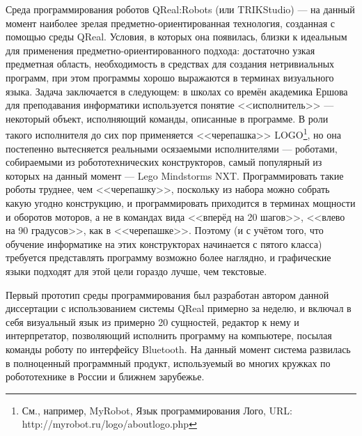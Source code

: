 Среда программирования роботов QReal:Robots (или TRIKStudio) --- на данный момент наиболее зрелая 
предметно-ориентированная технология, созданная с помощью среды QReal. 
Условия, в которых она появилась, близки к идеальным для применения 
предметно-ориентированного подхода: достаточно узкая предметная область, 
необходимость в средствах для создания нетривиальных программ, при этом
программы хорошо выражаются в терминах визуального языка. Задача заключается в 
следующем: в школах со времён академика Ершова для преподавания информатики 
используется понятие <<исполнитель>> --- некоторый объект, исполняющий команды, 
описанные в программе. В роли такого исполнителя до сих пор применяется 
<<черепашка>> 
LOGO\footnote{См., например, MyRobot, Язык программирования Лого, URL: http://myrobot.ru/logo/aboutlogo.php}, 
но она постепенно вытесняется реальными осязаемыми исполнителями --- роботами, собираемыми из робототехнических конструкторов, 
самый популярный из которых на данный момент --- Lego Mindstorms NXT. 
Программировать такие роботы труднее, чем <<черепашку>>, поскольку из набора 
можно собрать какую угодно конструкцию, и программировать приходится в терминах 
мощности и оборотов моторов, а не в командах вида <<вперёд на 20 шагов>>, 
<<влево на 90 градусов>>, как в <<черепашке>>. Поэтому (и с учётом того, что 
обучение информатике на этих конструкторах начинается с пятого класса) требуется 
представлять программу возможно более наглядно, и графические языки подходят 
для этой цели гораздо лучше, чем текстовые. 

Первый прототип среды программирования был разработан автором данной диссертации
с использованием системы QReal примерно за неделю, и включал в себя визуальный 
язык из примерно 20 сущностей, редактор к нему и интерпретатор, позволяющий 
исполнить программу на компьютере, посылая команды роботу по интерфейсу 
\ac{Bluetooth}. На данный момент система развилась в полноценный программный продукт, 
используемый во многих кружках по робототехнике в России и ближнем зарубежье.

